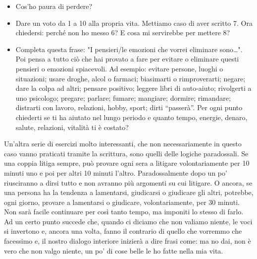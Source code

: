 \documentclass[12pt]{book} %
\begin{document}
\begin{itemize}
\item Cos'ho paura di perdere?
\item Dare un voto da 1 a 10 alla propria vita. Mettiamo caso di aver scritto 7. Ora chiedersi: perché non ho messo 6? E
cosa mi servirebbe per mettere 8? 
\item Completa questa frase: "I pensieri/le emozioni che vorrei eliminare
sono…". Poi pensa a tutto ciò che hai provato a fare per evitare o eliminare questi pensieri o
emozioni spiacevoli. Ad esempio: evitare persone, luoghi o situazioni; usare droghe, alcol o farmaci; biasimarti o
rimproverarti; negare; dare la colpa ad altri; pensare positivo; leggere libri di auto-aiuto; rivolgerti a uno
psicologo; pregare; parlare; fumare; mangiare; dormire; rimandare; distrarti con lavoro, relazioni, hobby, sport; dirti
“passerà”. Per ogni punto chiederti se ti ha aiutato nel lungo periodo e quanto tempo, energie, denaro, salute,
relazioni, vitalità ti è costato?
\end{itemize}
Un'altra serie di esercizi molto interessanti, che non necessariamente in questo caso vanno
praticati tramite la scrittura, sono quelli delle logiche paradossali. Se una coppia litiga sempre, può provare ogni
sera a litigare volontariamente per 10 minuti uno e poi per altri 10 minuti l'altro.
Paradossalmente dopo un po' riusciranno a dirsi tutto e non avranno più argomenti su cui litigare. O ancora, se una
persona ha la tendenza a lamentarsi, giudicarsi o giudicare gli altri, potrebbe, ogni giorno, provare a lamentarsi o
giudicare, volontariamente, per 30 minuti. Non sarà facile continuare per così tanto tempo, ma imponiti lo stesso di
farlo. Ad un certo punto succede che, quando ci diciamo che non valiamo niente, le voci si invertono e, ancora una
volta, fanno il contrario di quello che vorremmo che facessimo e, il nostro dialogo interiore inizierà a dire frasi
come: ma no dai, non è vero che non valgo niente, un po' di cose belle le ho fatte nella mia vita. 
\end{document}
